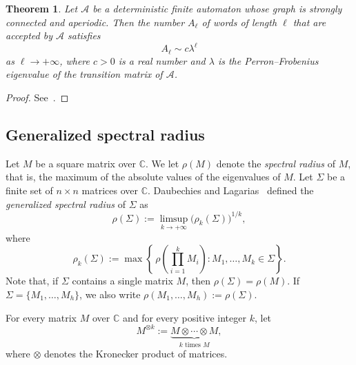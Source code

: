 \documentclass[11pt]{article}
\newtheorem{theorem}{Theorem}[section]
\theoremstyle{remark}\newtheorem{remark}[theorem]{Remark}
\begin{document}
\begin{theorem}\label{thm:perron-frobenius-automaton}
	Let $\mathcal{A}$ be a deterministic finite automaton whose graph is strongly connected and aperiodic.
	Then the number $A_\ell$ of words of length $\ell$ that are accepted by $\mathcal{A}$ satisfies
	\begin{equation*}
		A_\ell \sim c \lambda^\ell
	\end{equation*}
	as $\ell \to +\infty$, where $c > 0$ is a real number and $\lambda$ is the Perron--Frobenius eigenvalue of the transition matrix of $\mathcal{A}$.
\end{theorem}
\begin{proof}
	See~\cite[Proposition~V.7]{MR2483235}.
\end{proof}

\subsection{Generalized spectral radius}

Let $M$ be a square matrix over $\mathbb{C}$.
We let $\rho(M)$ denote the \emph{spectral radius} of $M$, that is, the maximum of the absolute values of the eigenvalues of $M$.
Let $\Sigma$ be a finite set of $n \times n$ matrices over $\mathbb{C}$.
Daubechies and Lagarias~\cite[p.~235]{MR1142737} defined the \emph{generalized spectral radius} of $\Sigma$ as
\begin{equation*}
	\rho(\Sigma) := \limsup_{k \to +\infty} \big(\rho_k(\Sigma)\big)^{1/k} ,
\end{equation*}
where
\begin{equation*}
	\rho_k(\Sigma) := \max\!\left\{ \,\rho\!\left(\prod_{i=1}^k M_i \right) : M_1, \dots, M_k \in \Sigma \right\} .
\end{equation*}
Note that, if $\Sigma$ contains a single matrix $M$, then $\rho(\Sigma) = \rho(M)$.
If $\Sigma = \{M_1, \dots, M_h\}$, we also write $\rho(M_1, \dots, M_h) := \rho(\Sigma)$.

For every matrix $M$ over $\mathbb{C}$ and for every positive integer $k$, let
\begin{equation*}
	M^{\otimes k} := \underbrace{M \otimes \cdots \otimes M}_{\text{$k$ times $M$}} ,
\end{equation*}
where $\otimes$ denotes the Kronecker product of matrices.
\end{document}
